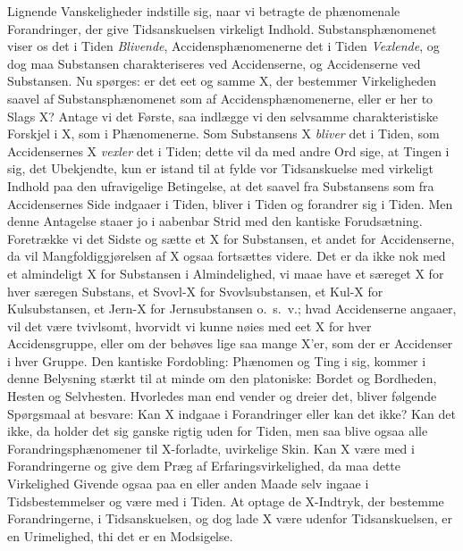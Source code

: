 \documentclass[12pt]{article}
\newcommand{\opage}[1]{\marginnote{\footnotesize\textit{[#1]}}}
\begin{document}
Lignende Vanskeligheder indstille sig, naar vi betragte de
phænomenale Forandringer, der give Tidsanskuelsen virkeligt
Indhold. Substansphænomenet viser os det i Tiden \emph{Blivende},
Accidensphænomenerne det i Tiden \emph{Vexlende}, og dog maa
Substansen charakteriseres ved Accidenserne, og Accidenserne
ved Substansen. Nu spørges: er det eet og samme X, der
bestemmer Virkeligheden saavel af Substansphænomenet som af
Accidensphænomenerne, eller er her to Slags X? Antage vi
det Første, saa indlægge vi den selvsamme charakteristiske
Forskjel i X, som i Phænomenerne. Som Substansens X
\emph{bliver} det i Tiden, som Accidensernes X \emph{vexler} det i Tiden;
dette vil da med andre Ord sige, at Tingen i sig, det
Ubekjendte, kun er istand til at fylde vor Tidsanskuelse med
virkeligt Indhold paa den ufravigelige Betingelse, at det saavel
fra Substansens som fra Accidensernes Side indgaaer i Tiden,
bliver i Tiden og forandrer sig i Tiden. Men denne Antagelse
staaer jo i aabenbar Strid med den kantiske Forudsætning.
Foretrække vi det Sidste og sætte et X for Substansen, et andet
for Accidenserne, da vil Mangfoldiggjørelsen af X ogsaa fort\-sættes
videre. Det er da ikke nok med et almindeligt X for
Substansen i Almindelighed, vi maae have et særeget X for
hver særegen Substans, et Svovl-X for Svovlsubstansen, et
Kul-X for Kulsubstansen, et Jern-X for Jernsubstansen o.\ s.\ v.;
\opage{12} hvad Accidenserne angaaer, vil det være tvivlsomt, hvorvidt vi
kunne nøies med eet X for hver Accidensgruppe, eller om der
behøves lige saa mange X'er, som der er Accidenser i hver
Gruppe. Den kantiske Fordobling: Phænomen og Ting i sig,
kommer i denne Belysning stærkt til at minde om den
platoniske: Bordet og Bordheden, Hesten og Selvhesten. Hvorledes
man end vender og dreier det, bliver følgende Spørgsmaal at
besvare: Kan X indgaae i Forandringer eller kan det ikke?
Kan det ikke, da holder det sig ganske rigtig uden for Tiden,
men saa blive ogsaa alle Forandringsphænomener til X-for\-ladte,
uvirkelige Skin. Kan X være med i Forandringerne og
give dem Præg af Erfaringsvirkelighed, da maa dette Virkelig\-hed
Givende ogsaa paa en eller anden Maade selv ingaae i
Tidsbestemmelser og være med i Tiden. At optage de X-Indtryk,
der bestemme Forandringerne, i Tidsanskuelsen, og
dog lade X være udenfor Tidsanskuelsen, er en Urimelighed,
thi det er en Modsigelse.
\end{document}
